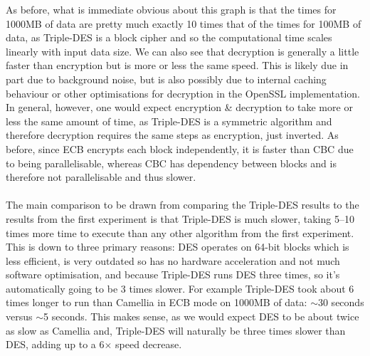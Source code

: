 \documentclass[a4paper]{article}
\begin{document}
As before, what is immediate obvious about this graph is that the times for 1000MB of data are pretty much exactly 10 times that of the times for 100MB of data, as Triple-DES is a block cipher and so the computational time scales linearly with input data size.
We can also see that decryption is generally a little faster than encryption but is more or less the same speed. 
This is likely due in part due to background noise, but is also possibly due to internal caching behaviour or other optimisations for decryption in the OpenSSL implementation.
In general, however, one would expect encryption \& decryption to take more or less the same amount of time, as Triple-DES is a symmetric algorithm and therefore decryption requires the same steps as encryption, just inverted.
As before, since ECB encrypts each block independently, it is faster than CBC due to being parallelisable, whereas CBC has dependency between blocks and is therefore not parallelisable and thus slower.
\\\\
The main comparison to be drawn from comparing the Triple-DES results to the results from the first experiment is that Triple-DES is much slower, taking 5--10 times more time to execute than any other algorithm from the first experiment.
This is down to three primary reasons: DES operates on 64-bit blocks which is less efficient, is very outdated so has no hardware acceleration and not much software optimisation, and because Triple-DES runs DES three times, so it's automatically going to be 3 times slower.
For example Triple-DES took about 6 times longer to run than Camellia in ECB mode on 1000MB of data: $\sim$30 seconds versus $\sim$5 seconds.
This makes sense, as we would expect DES to be about twice as slow as Camellia and, Triple-DES will naturally be three times slower than DES, adding up to a 6$\times$ speed decrease.
\end{document}
